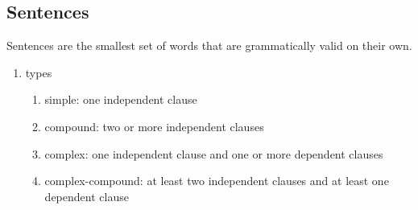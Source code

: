 \documentclass[12pt]{article}
\begin{document}
\subsection{Sentences}
Sentences are the smallest set of words that are grammatically valid on their own.

\begin{enumerate}
\item types
    \begin{enumerate}
    \item simple: one independent clause
    \item compound: two or more independent clauses
    \item complex: one independent clause and one or more dependent clauses
    \item complex-compound: at least two independent clauses and at least one dependent clause
    \end{enumerate}
\end{enumerate}
\end{document}
